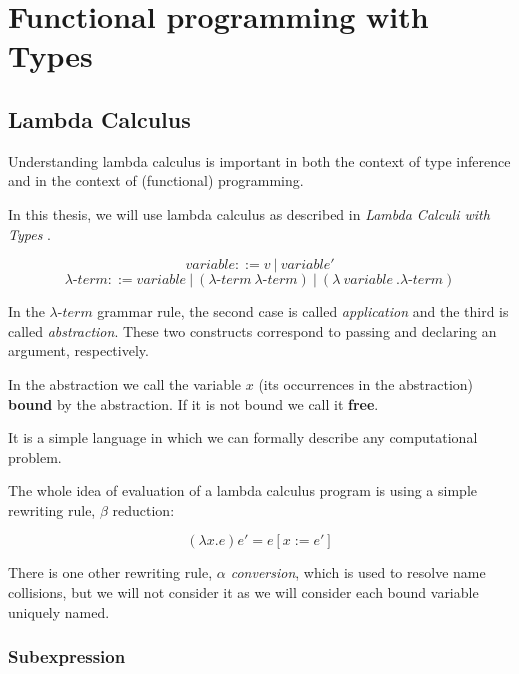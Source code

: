 \chapter{Functional programming with Types}

\section{Lambda Calculus}

Understanding lambda calculus is important in both the context of type inference and in the context of (functional) programming.

In this thesis, we will use lambda calculus as described in  \emph{Lambda Calculi with Types} \cite{barendregt1992lambda}.

\begin{defn}
$$variable ::= v\ |\ variable'$$
$$\lambda\mbox{-}term ::= variable\ |\ (\lambda\mbox{-}term\ \lambda\mbox{-}term)\ |\ (\lambda\ variable\ . \lambda\mbox{-}term )$$
\end{defn}

In the $\lambda\mbox{-}term$ grammar rule, the second case is called \emph{application} and the third is called \emph{abstraction}. These two constructs correspond to passing and declaring an argument, respectively.

\begin{defn}
    \label{defn:boundFree}
    In the abstraction we call the variable $x$ (its occurrences in the abstraction) \textbf{bound} by the abstraction. If it is not bound we call it \textbf{free}.
\end{defn}

It is a simple language in which we can formally describe any computational problem.

The whole idea of evaluation of a lambda calculus program is using a simple rewriting rule, $\beta$ reduction:

\begin{defn}
    $$(\lambda x . e) e' = e [x := e']$$ \cite{barendregt1992lambda}
\end{defn}

There is one other rewriting rule, \emph{$\alpha$ conversion}, which is used to resolve name collisions, but we will not consider it as we will consider each bound variable uniquely named.

\subsection{Subexpression}

